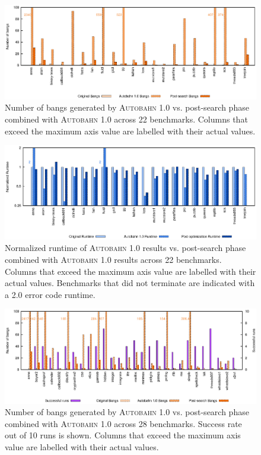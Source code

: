 \documentclass[format=sigplan, review=true]{acmart}
\newcommand{\Ao}[0]{\textsc{Autobahn 1.0}}
\newcommand{\postopt}[0]{post-search}
\begin{document}
\begin{figure}
\includegraphics[width=\textwidth]{aut-post-bangs}
\caption{Number of bangs generated by \Ao{} vs. \postopt{} phase combined with \Ao{} across 22 benchmarks. Columns that exceed the maximum axis value are labelled with their actual values.}
\end{figure}

\begin{figure}
\includegraphics[width=\textwidth]{aut-post}
\caption{Normalized runtime of \Ao{} results vs. \postopt{} phase combined with \Ao{} results across 22 benchmarks. Columns that exceed the maximum axis value are labelled with their actual values. Benchmarks that did not terminate are indicated with a 2.0 error code runtime.}
\end{figure}

\begin{figure}
\includegraphics[width=\textwidth]{ap-partial-bangs}
\caption{Number of bangs generated by \Ao{} vs. \postopt{} phase combined with \Ao{} across 28 benchmarks. Success rate out of 10 runs is shown. Columns that exceed the maximum axis value are labelled with their actual values.}
\end{figure}
\end{document}
